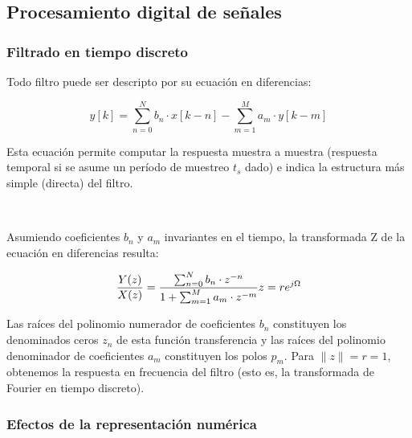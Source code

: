 \documentclass[11pt, journal]{IEEEtran}
\begin{document}
    \subsection{Procesamiento digital de señales}\label{procesamiento-digital-de-seuxf1ales}

\subsubsection{Filtrado en tiempo discreto}\label{filtrado-en-tiempo-discreto}

Todo filtro puede ser descripto por su ecuación en diferencias:

\begin{equation}
y[k] = \sum^N_{n = 0} b_n \cdot x[k - n] - \sum^M_{m = 1} a_m \cdot y[k - m]
\end{equation}

Esta ecuación permite computar la respuesta muestra a muestra (respuesta
temporal si se asume un período de muestreo \(t_s\) dado) e indica la
estructura más simple (directa) del filtro.

    \begin{center}
    \end{center}
    { \hspace*{\fill} \\}
    

    Asumiendo coeficientes \(b_n\) y \(a_m\) invariantes en el tiempo, la
transformada Z de la ecuación en diferencias resulta:


\begin{equation}
\frac{Y(z)}{X(z)} = \frac{\sum^N_{n = 0} b_n \cdot z^{-n}}{1 + \sum^M_{m = 1} a_m \cdot z^{-m}} \\ 
z = re^{j\Omega}
\end{equation}

Las raíces del polinomio numerador de coeficientes \(b_n\) constituyen
los denominados ceros \(z_n\) de esta función transferencia y las raíces
del polinomio denominador de coeficientes \(a_m\) constituyen los polos
\(p_m\). Para \(\|z\| = r = 1\), obtenemos la respuesta en frecuencia
del filtro (esto es, la transformada de Fourier en tiempo discreto).

    \subsubsection{Efectos de la representación numérica}
\end{document}
